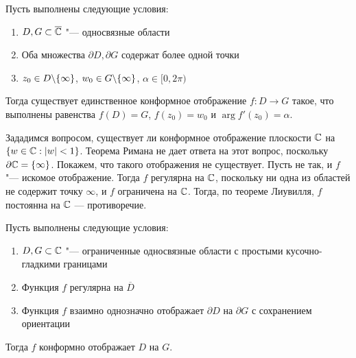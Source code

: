 \begin{theorem}
	Пусть выполнены следующие условия:
	\begin{enumerate}
		\item $D, G \subset \overline{\mathbb{C}}$ "--- односвязные области
		\item Оба множества $\partial D, \partial G$ содержат более одной точки
		\item $z_0 \in D \backslash \{\infty\}$, $w_0 \in G \backslash \{\infty\}$, $\alpha \in [0, 2\pi)$
	\end{enumerate}
	
	Тогда существует единственное конформное отображение $f : D \to G$ такое, что выполнены равенства $f(D) = G$, $f(z_0) = w_0$ и $\arg f'(z_0) = \alpha$.
\end{theorem}

\begin{unnecessary}
    \begin{example}
    	Зададимся вопросом, существует ли конформное отображение плоскости $\mathbb{C}$ на $\{w \in \mathbb{C}: |w| < 1\}$. Теорема Римана не дает ответа на этот вопрос, поскольку $\partial \mathbb{C} = \{\infty\}$. Покажем, что такого отображения не существует. Пусть не так, и $f$ "--- искомое отображение. Тогда $f$ регулярна на $\mathbb{C}$, поскольку ни одна из областей не содержит точку $\infty$, и $f$ ограничена на $\mathbb{C}$. Тогда, по теореме Лиувилля, $f$ постоянна на $\mathbb{C}$ --- противоречие.
    \end{example}
\end{unnecessary}

\begin{theorem}
	Пусть выполнены следующие условия:
	\begin{enumerate}
		\item $D, G \subset \mathbb{C}$ "--- ограниченные односвязные области с простыми кусочно-гладкими границами
		\item Функция $f$ регулярна на $\overline{D}$
		\item Функция $f$ взаимно однозначно отображает $\partial D$ на $\partial G$ с сохранением ориентации
	\end{enumerate}
	
	Тогда $f$ конформно отображает $D$ на $G$.
\end{theorem}

